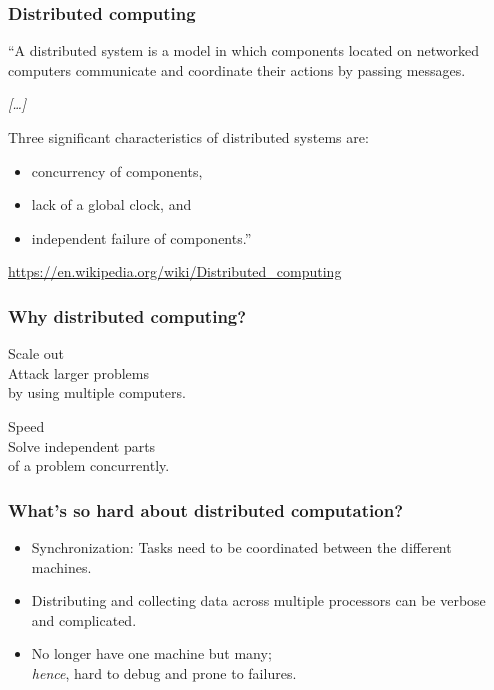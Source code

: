\documentclass[english,serif,mathserif]{beamer}
\begin{document}
\begin{frame}
  \frametitle{Distributed computing}

  ``A distributed system is a model in which components located on networked
  computers communicate and coordinate their actions by passing messages.

  \+
  \emph{[\ldots]}

  \+
  Three significant characteristics of distributed systems are:
  \begin{itemize}
  \item concurrency of components,
  \item lack of a global clock, and
  \item independent failure of components.''%
  \end{itemize}

  \+
  \begin{references}
    \url{https://en.wikipedia.org/wiki/Distributed_computing}
  \end{references}
\end{frame}


\begin{frame}
  \frametitle{Why distributed computing?}

  \begin{center}
    {\Large Scale out}
    \\
    Attack larger problems \\ by using multiple computers.

    \+\+
    {\Large Speed}
    \\
    Solve independent parts \\ of a problem concurrently.
  \end{center}
\end{frame}


\begin{frame}
  \frametitle{What's so hard about distributed computation?}

  \begin{itemize}
  \item \alert<1>{Synchronization:} Tasks need to be
    coordinated between the different machines.

    \+\item \alert<1>{Distributing} and
    \alert<1>{collecting} data across multiple processors can
    be verbose and complicated.

    \+\item No longer have one machine but many; \\
    \emph{hence}, \alert<1>{hard to debug} and prone to failures.
  \end{itemize}
\end{frame}
\end{document}
